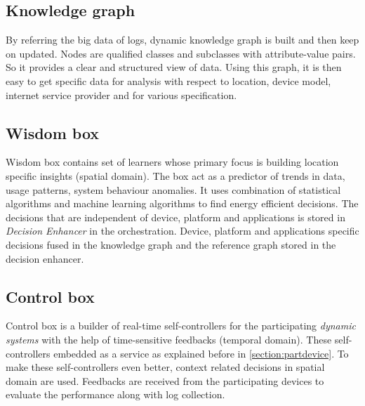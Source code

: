 		\subsection{Knowledge graph}
		By referring the big data of logs, dynamic knowledge graph is built and then keep on updated. Nodes are qualified classes and subclasses with attribute-value pairs. So it provides a clear and structured view of data. Using this graph, it is then easy to get specific data for analysis with respect to location, device model, internet service provider and for various specification.
		\subsection{Wisdom box}
		Wisdom box contains set of learners whose primary focus is building location specific insights (spatial domain). The box act as a predictor of trends in data, usage patterns, system behaviour anomalies. It uses combination of statistical algorithms and machine learning algorithms to find energy efficient decisions. The decisions that are independent of device, platform and applications is stored in \emph{Decision Enhancer} in the orchestration. Device, platform and applications specific decisions fused in the knowledge graph and the reference graph stored in the decision enhancer. 
		\subsection{Control box}
		Control box is a builder of real-time self-controllers for the participating \textit{dynamic systems} with the help of time-sensitive feedbacks (temporal domain). These self-controllers embedded as a service as explained before in \ref{section:partdevice}. To make these self-controllers even better, context related decisions in spatial domain are used. Feedbacks are received from the participating devices to evaluate the performance along with log collection.
		
		
		

